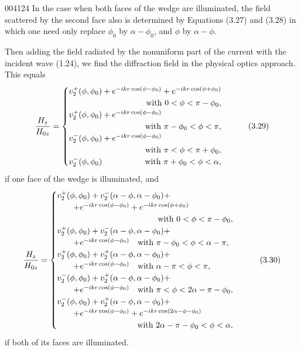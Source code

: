 \begin{scanpage}{0041}{24}
In the case when both faces of the wedge are illuminated, the field scattered by the second face also is determined by Equations (3.27) and (3.28) in which one need only replace $\phi_0$ by $\alpha-\phi_0$, and $\phi$ by $\alpha-\phi$.

Then adding the field radiated by the nonuniform part of the current with the incident wave (1.24), we find the diffraction field in the physical optics approach. This equals
\[\frac{H_z}{H_{0z}}=\begin{cases}v_2^+(\phi,\phi_0)+e^{-ikr\cos(\phi-\phi_0)}+e^{-ikr\cos(\phi+\phi_0)}\\\hfill\text{with }0<\phi<\pi-\phi_0,\\v_2^+(\phi,\phi_0)+e^{-ikr\cos(\phi-\phi_0)}\\\hfill\text{with }\pi-\phi_0<\phi<\pi,\\v_2^-(\phi,\phi_0)+e^{-ikr\cos(\phi-\phi_0)}\\\hfill\text{with }\pi<\phi<\pi+\phi_0,\\v_2^-(\phi,\phi_0)\hfill\text{with }\pi+\phi_0<\phi<\alpha,\end{cases}\tag{3.29}\]
if one face of the wedge is illuminated, and
\[\frac{H_z}{H_{0z}}=\begin{cases}v_2^+(\phi,\phi_0)+v_2^-(\alpha-\phi,\alpha-\phi_0)+\\\qquad+e^{-ikr\cos(\phi-\phi_0)}+e^{-ikr\cos(\phi+\phi_0)}\\\hfill\text{with }0<\phi<\pi-\phi_0,\\v_2^+(\phi,\phi_0)+v_2^-(\alpha-\phi,\alpha-\phi_0)+\\\qquad+e^{-ikr\cos(\phi-\phi_0)}\quad\text{with }\pi-\phi_0<\phi<\alpha-\pi,\\v_2^+(\phi,\phi_0)+v_2^+(\alpha-\phi,\alpha-\phi_0)+\\\qquad+e^{-ikr\cos(\phi-\phi_0)}\quad\text{with }\alpha-\pi<\phi<\pi,\\v_2^-(\phi,\phi_0)+v_2^+(\alpha-\phi,\alpha-\phi_0)+\\\qquad+e^{-ikr\cos(\phi-\phi_0)}\quad\text{with }\pi<\phi<2\alpha-\pi-\phi_0,\\v_2^-(\phi,\phi_0)+v_2^+(\alpha-\phi,\alpha-\phi_0)+\\\qquad+e^{-ikr\cos(\phi-\phi_0)}+e^{-ikr\cos(2\alpha-\phi-\phi_0)}\\\hfill\text{with }2\alpha-\pi-\phi_0<\phi<\alpha,\end{cases}\tag{3.30}\]
if both of its faces are illuminated.
\end{scanpage}
